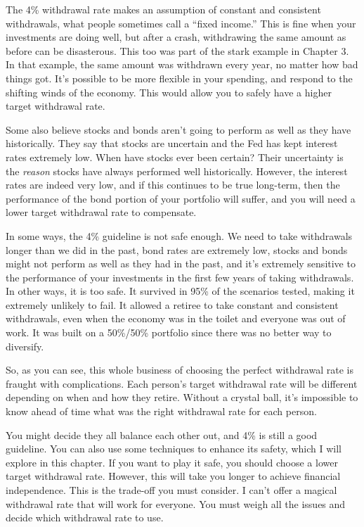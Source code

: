 The 4\% withdrawal rate makes an assumption of constant and consistent withdrawals, what people sometimes call a ``fixed income.'' This is fine when your investments are doing well, but after a crash, withdrawing the same amount as before can be disasterous. This too was part of the stark example in Chapter 3. In that example, the same amount was withdrawn every year, no matter how bad things got. It's possible to be more flexible in your spending, and respond to the shifting winds of the economy. This would allow you to safely have a higher target withdrawal rate.

Some also believe stocks and bonds aren't going to perform as well as they have historically. They say that stocks are uncertain and the Fed has kept interest rates extremely low.\cite{schwab-withdrawal-rate} When have stocks ever been certain? Their uncertainty is the \emph{reason} stocks have always performed well historically. However, the interest rates are indeed very low, and if this continues to be true long-term, then the performance of the bond portion of your portfolio will suffer, and you will need a lower target withdrawal rate to compensate.

In some ways, the 4\% guideline is not safe enough. We need to take withdrawals longer than we did in the past, bond rates are extremely low, stocks and bonds might not perform as well as they had in the past, and it's extremely sensitive to the performance of your investments in the first few years of taking withdrawals. In other ways, it is too safe. It survived in 95\% of the scenarios tested, making it extremely unlikely to fail. It allowed a retiree to take constant and consistent withdrawals, even when the economy was in the toilet and everyone was out of work. It was built on a 50\%/50\% portfolio since there was no better way to diversify.

So, as you can see, this whole business of choosing the perfect withdrawal rate is fraught with complications. Each person's target withdrawal rate will be different depending on when and how they retire. Without a crystal ball, it's impossible to know ahead of time what was the right withdrawal rate for each person.

You might decide they all balance each other out, and 4\% is still a good guideline. You can also use some techniques to enhance its safety, which I will explore in this chapter. If you want to play it safe, you should choose a lower target withdrawal rate. However, this will take you longer to achieve financial independence. This is the trade-off you must consider. I can't offer a magical withdrawal rate that will work for everyone. You must weigh all the issues and decide which withdrawal rate to use.

